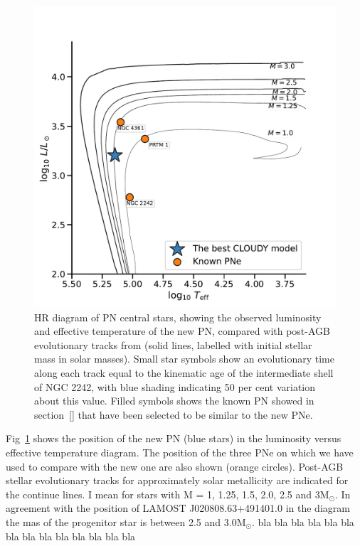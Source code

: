 \documentclass[fleqn,usenatbib]{mnras}
\begin{document}
\begin{figure}
\centering
  \includegraphics[width=\linewidth]{Figs/hr-planetarieNebula}
  \caption{HR diagram of PN central stars, showing the observed luminosity
and effective temperature of the new PN, compared with
post-AGB evolutionary tracks from \citet{Miller:2016} (solid lines,
labelled with initial stellar mass in solar masses). Small star symbols show
an evolutionary time along each track equal to the kinematic age of the
intermediate shell of NGC 2242, with blue shading indicating 50 per cent
variation about this value. Filled symbols shows the known PN showed in section~\ref{}
that have been selected to be similar to the new PNe.} 
 \label{fig:track-evolutive}
\end{figure}

Fig~\ref{fig:track-evolutive} shows the position of the new PN (blue stars) in the luminosity
versus effective temperature diagram. The position of the three PNe on which we have used to
compare with the new one are also shown (orange circles). Post-AGB stellar evolutionary tracks
for approximately solar metallicity \citep{Miller:2016} are indicated for the continue lines.
I mean for stars with M = 1, 1.25, 1.5, 2.0, 2.5 and 3M$_{\odot}$. In agreement with the
position of LAMOST J020808.63+491401.0 in the diagram the mas of the progenitor star is
between 2.5 and 3.0M$_{\odot}$. {\sc bla bla bla bla bla bla bla bla bla bla bla bla bla bla}
\end{document}
